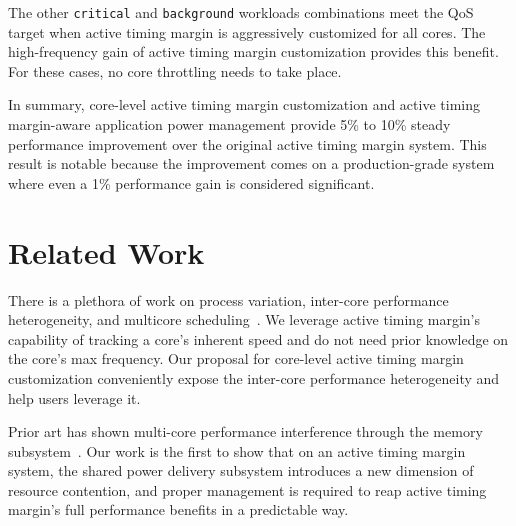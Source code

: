 The other \texttt{critical} and \texttt{background} workloads combinations meet the QoS target when active timing margin is aggressively customized for all cores. The high-frequency gain of active timing margin customization provides this benefit. For these cases, no core throttling needs to take place.

In summary, core-level active timing margin customization and active timing margin-aware application power management provide 5\% to 10\% steady performance improvement over the original active timing margin system. This result is notable because the improvement comes on a production-grade system where even a 1\% performance gain is considered significant.

\section{Related Work}
\label{sec:process:related}

There is a plethora of work on process variation, inter-core performance heterogeneity, and multicore scheduling~\cite{liang2007process,sarangi2008varius,teodorescu2008variation,rangan2009thread,dighe2010within,rangan2011achieving}. We leverage active timing margin's capability of tracking a core's inherent speed and do not need prior knowledge on the core's max frequency. Our proposal for core-level active timing margin customization conveniently expose the inter-core performance heterogeneity and help users leverage it.

Prior art has shown multi-core performance interference through the memory subsystem~\cite{mars11micro,tang11isca,delimitrou2014quasar,lo2015heracles,verma2015large,llull2017cooper}. Our work is the first to show that on an active timing margin system, the shared power delivery subsystem introduces a new dimension of resource contention, and proper management is required to reap active timing margin's full performance benefits in a predictable way.

